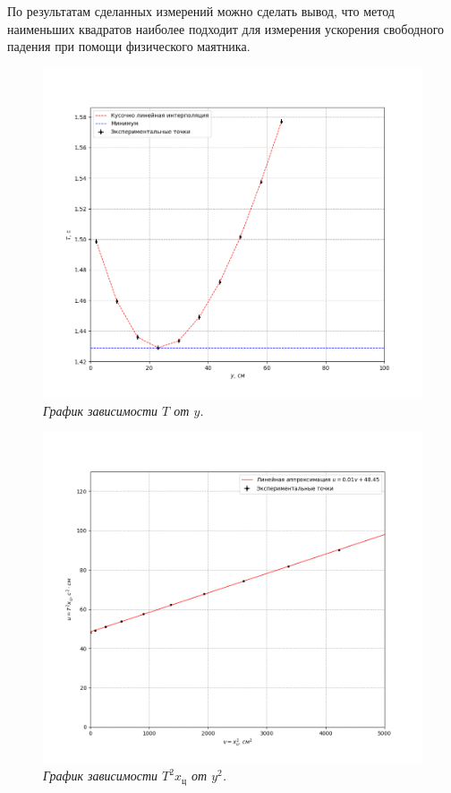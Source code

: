 \documentclass[a4paper,12pt]{article}
\begin{document}
По результатам сделанных измерений можно сделать вывод, что метод наименьших квадратов наиболее подходит для измерения ускорения свободного падения при помощи физического маятника.

\newpage

\begin{figure}[h!]
	\includegraphics[width=1\linewidth]{graph-1.png}
	\caption{\textit{График зависимости $T$ от $y$.}}
	\label{graph-1}
\end{figure}

\begin{figure}[h!]
    \includegraphics[width=1\textwidth]{graph-2.png}
    \caption{\textit{График зависимости $T^2x_\text{ц}$ от $y^2$.}}
    \label{graph-2}
\end{figure}
\end{document}
